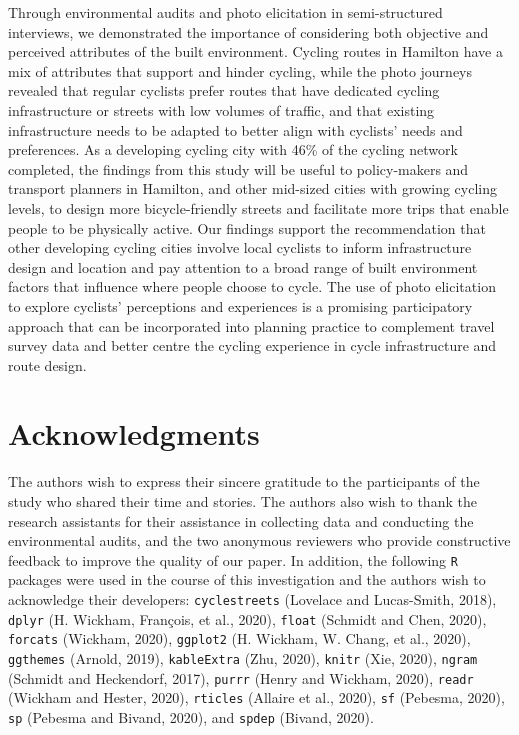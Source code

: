 \documentclass[]{elsarticle} %
\begin{document}
Through environmental audits and photo elicitation in semi-structured
interviews, we demonstrated the importance of considering both objective
and perceived attributes of the built environment. Cycling routes in
Hamilton have a mix of attributes that support and hinder cycling, while
the photo journeys revealed that regular cyclists prefer routes that
have dedicated cycling infrastructure or streets with low volumes of
traffic, and that existing infrastructure needs to be adapted to better
align with cyclists' needs and preferences. As a developing cycling city
with 46\% of the cycling network completed, the findings from this study
will be useful to policy-makers and transport planners in Hamilton, and
other mid-sized cities with growing cycling levels, to design more
bicycle-friendly streets and facilitate more trips that enable people to
be physically active. Our findings support the recommendation that other
developing cycling cities involve local cyclists to inform
infrastructure design and location and pay attention to a broad range of
built environment factors that influence where people choose to cycle.
The use of photo elicitation to explore cyclists' perceptions and
experiences is a promising participatory approach that can be
incorporated into planning practice to complement travel survey data and
better centre the cycling experience in cycle infrastructure and route
design.

\hypertarget{sec:acknowledgments}{%
\section{Acknowledgments}\label{sec:acknowledgments}}

The authors wish to express their sincere gratitude to the participants
of the study who shared their time and stories. The authors also wish to
thank the research assistants for their assistance in collecting data
and conducting the environmental audits, and the two anonymous reviewers
who provide constructive feedback to improve the quality of our paper.
In addition, the following \texttt{R} packages were used in the course
of this investigation and the authors wish to acknowledge their
developers: \texttt{cyclestreets} (Lovelace and Lucas-Smith, 2018),
\texttt{dplyr} (H. Wickham, François, et al., 2020), \texttt{float}
(Schmidt and Chen, 2020), \texttt{forcats} (Wickham, 2020),
\texttt{ggplot2} (H. Wickham, W. Chang, et al., 2020), \texttt{ggthemes}
(Arnold, 2019), \texttt{kableExtra} (Zhu, 2020), \texttt{knitr} (Xie,
2020), \texttt{ngram} (Schmidt and Heckendorf, 2017), \texttt{purrr}
(Henry and Wickham, 2020), \texttt{readr} (Wickham and Hester, 2020),
\texttt{rticles} (Allaire et al., 2020), \texttt{sf} (Pebesma, 2020),
\texttt{sp} (Pebesma and Bivand, 2020), and \texttt{spdep} (Bivand,
2020).
\end{document}
